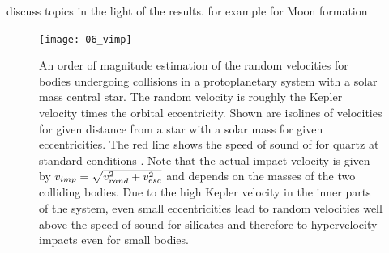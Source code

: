 discuss topics in the light of the results. for example for Moon formation

\begin{figure}[htbp]
\begin{center}
\texttt{[image: 06\_vimp]}
\caption{An order of magnitude estimation of the random velocities for bodies undergoing collisions in a protoplanetary system with a solar mass central star. The random velocity is roughly the Kepler velocity times the orbital eccentricity. Shown are isolines of velocities for given distance from a star with a solar mass for given eccentricities. The red line shows the speed of sound of for quartz at standard conditions \cite{Melosh:2007p3502}. Note that the actual impact velocity is given by $v_{imp} = \sqrt{ v_{rand}^2 + v_{esc}^2}$ and depends on the masses of the two colliding bodies. Due to the high Kepler velocity in the inner parts of the system, even small eccentricities lead to random velocities well above the speed of sound for silicates and therefore to hypervelocity impacts even for small bodies.}
\label{ch03_fig06}
\end{center}
\end{figure}






	
\cite{Agnor:2004p3329}

\cite{Asphaug:2006p3729}

\cite{Asphaug:2010p3539}


